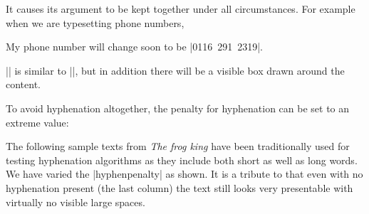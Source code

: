{{It causes its argument to be kept together under all circumstances. 
For example when we are typesetting phone numbers,

\begin{teX}
My phone number will change soon to be |\mbox{0116 291 2319}|.
\end{teX}

\noindent |\fbox| is similar to |\mbox|, but in addition there will be a visible box drawn around the content.

To avoid hyphenation altogether, the penalty for hyphenation can be set to an extreme value:

\begin{teX}
\end{teX}



The following sample texts from \textit{The frog king}\cite{frogking} have been traditionally used for testing hyphenation algorithms as they
include both short as well as long words. We have varied the |hyphenpenalty| as shown. It is a tribute to \tex that even with no hyphenation present (the last column) the text still looks very presentable with virtually no visible large spaces.

\long{}

\overfullrule=0.1pt

\begin{minipage}{1.9in}
 \sampletext
\end{minipage}\hspace{.8cm}
\begin{minipage}{1.9in}
 \sampletext
\end{minipage}\hspace{.8cm}
\begin{minipage}{1.9in}
  \sampletext
\end{minipage}


}}
